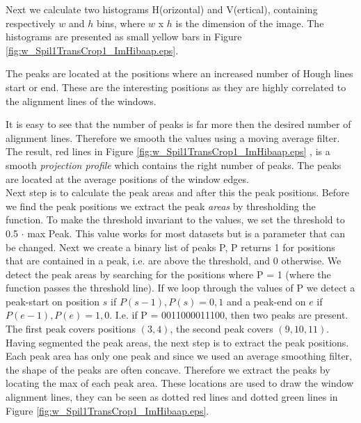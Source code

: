 Next we calculate two histograms H(orizontal) and V(ertical), containing respectively
$w$ and $h$ bins, where $w$ x $h$ is the dimension of the image.  The histograms
are presented as small yellow bars in Figure \ref{fig:w_Spil1TransCrop1_ImHibaap.eps}.

The peaks are located at the positions where an increased number of Hough lines
start or end.  These are the interesting positions as they are highly correlated
to the alignment lines of the windows. 

It is easy to see that the number of peaks is far more then the desired number of alignment lines.
Therefore we smooth the values using a moving average filter.
The result, red lines in Figure \ref{fig:w_Spil1TransCrop1_ImHibaap.eps}
, is a smooth \emph{projection profile} which contains the right number of peaks. The peaks
are located at the average positions of the window edges. \\

Next step is to calculate the peak areas and after this the peak positions. 
Before we find the peak positions we extract the peak \emph{areas} by thresholding the
function. To make the threshold invariant to the values, we set the threshold to 0.5 $\cdot$ max Peak. 
This value works for most datasets but is a parameter that can be changed.
Next we create a binary list of peaks P, P returns 1 for positions that are contained in
a peak, i.e. are above the threshold, and 0 otherwise.
We detect the peak areas by searching for the positions where P = 1
(where the function passes the threshold line). 
If we loop through the values of P we detect a peak-start on position $s$ if ${P(s-1),P(s)}={0,1}$
and a peak-end on $e$ if ${P(e-1),P(e)}={1,0}$. 
I.e. if P = 0011000011100, then two peaks are present. The first peak covers positions $(3,4)$, 
the second peak covers $(9,10,11)$.\\

Having segmented the peak areas, the next step is to extract the peak positions. 
Each peak area has only one peak and since we used an average smoothing filter, the shape of 
the peaks are often concave. Therefore we extract the peaks by locating the max of each peak area. 
These locations are used to draw the window alignment lines, they can be seen
as dotted red lines and dotted green lines in Figure \ref{fig:w_Spil1TransCrop1_ImHibaap.eps}.

